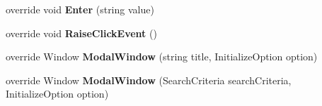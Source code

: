 \begin{DoxyCompactItemize}
\item 
\hypertarget{class_proto_test_1_1_golem_1_1_white_1_1_elements_1_1_white_window_a79091dcf2532ceeb0801623baaecb148}{override void {\bfseries Enter} (string value)}\label{class_proto_test_1_1_golem_1_1_white_1_1_elements_1_1_white_window_a79091dcf2532ceeb0801623baaecb148}

\item 
\hypertarget{class_proto_test_1_1_golem_1_1_white_1_1_elements_1_1_white_window_a6f422586b20c7ca2731a2cfe47bbb26a}{override void {\bfseries Raise\-Click\-Event} ()}\label{class_proto_test_1_1_golem_1_1_white_1_1_elements_1_1_white_window_a6f422586b20c7ca2731a2cfe47bbb26a}

\item 
\hypertarget{class_proto_test_1_1_golem_1_1_white_1_1_elements_1_1_white_window_a6128374e7e0115b5b2671234ac84ad0c}{override Window {\bfseries Modal\-Window} (string title, Initialize\-Option option)}\label{class_proto_test_1_1_golem_1_1_white_1_1_elements_1_1_white_window_a6128374e7e0115b5b2671234ac84ad0c}

\item 
\hypertarget{class_proto_test_1_1_golem_1_1_white_1_1_elements_1_1_white_window_a6604e1101cfd5141d0f829d1b743fce0}{override Window {\bfseries Modal\-Window} (Search\-Criteria search\-Criteria, Initialize\-Option option)}\label{class_proto_test_1_1_golem_1_1_white_1_1_elements_1_1_white_window_a6604e1101cfd5141d0f829d1b743fce0}

\end{DoxyCompactItemize}
